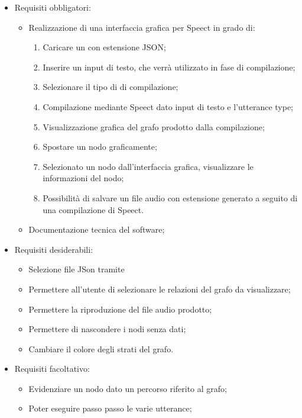 \documentclass[../AnalisideiRequisiti.tex]{subfiles}
\begin{document}
\begin{itemize}
	\item{} Requisiti obbligatori:
	\begin{itemize}
		\item{}Realizzazione di una interfaccia grafica per Speect in grado di:
		\begin{enumerate}
			\item{} Caricare un  con estensione JSON;
			\item{} Inserire un input di testo, che verrà utilizzato in fase di compilazione;
			\item{} Selezionare il tipo di  di compilazione;
			\item{} Compilazione mediante Speect dato input di testo e l'utterance type;
			\item{} Visualizzazione grafica del grafo prodotto dalla compilazione;
			\item{} Spostare un nodo graficamente;
			\item{} Selezionato un nodo dall'interfaccia grafica, visualizzare le informazioni del nodo;
			\item{} Possibilità di salvare un file audio con estensione  generato a seguito di una compilazione di Speect.
		\end{enumerate}
		\item{}	Documentazione tecnica del software;
	\end{itemize}
	\item{} Requisiti desiderabili:
	\begin{itemize}
		\item{} Selezione file JSon tramite 
		\item{} Permettere all'utente di selezionare le relazioni del grafo da visualizzare;
		\item{} Permettere la riproduzione del file audio prodotto;
		\item{} Permettere di nascondere i nodi senza dati;
		\item{} Cambiare il colore degli strati del grafo.
	\end{itemize}
	\item{} Requisiti facoltativo:
	\begin{itemize}
		\item{} Evidenziare un nodo dato un percorso riferito al grafo;
		\item{} Poter eseguire passo passo le varie utterance;

\end{itemize}
\end{itemize}
\end{document}
